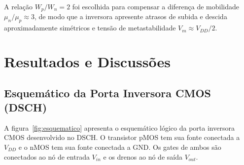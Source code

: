 \documentclass[12pt,a4paper]{article}
\begin{document}
A relação $W_p / W_n = 2$ foi escolhida para compensar a diferença de mobilidade
$\mu_n / \mu_p \approx 3$, de modo que a inversora apresente atrasos de subida
e descida aproximadamente simétricos e tensão de metastabilidade $V_m \approx V_{DD}/2$.

\section{Resultados e Discussões}

\subsection{Esquemático da Porta Inversora CMOS (DSCH)}

A figura~\ref{fig:esquematico} apresenta o esquemático lógico da porta inversora
CMOS desenvolvido no DSCH. O transistor pMOS tem sua fonte conectada a $V_{DD}$
e o nMOS tem sua fonte conectada a GND. Os gates de ambos são conectados ao nó
de entrada $V_{in}$ e os drenos ao nó de saída $V_{out}$.
\end{document}
